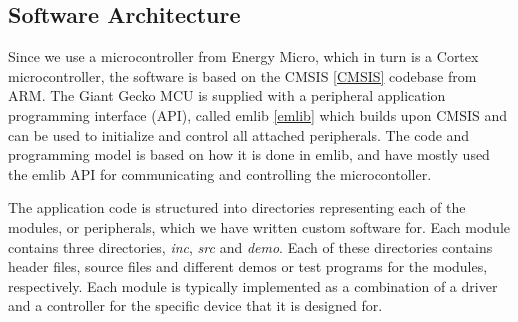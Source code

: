 \subsection{Software Architecture}


Since we use a microcontroller from Energy Micro, which in turn is a Cortex
microcontroller, the software is based on the CMSIS \ref{CMSIS} codebase from
ARM. The Giant Gecko MCU is supplied with a peripheral application programming
interface (API), called emlib \ref{emlib} which builds upon CMSIS and can be
used to initialize and control all attached peripherals. The code and
programming model is based on how it is done in emlib, and have mostly used the
emlib API for communicating and controlling the microcontoller.



The application code is structured into directories representing each of the
modules, or peripherals, which we have written custom software for. Each module
contains three directories, \textit{inc}, \textit{src} and \textit{demo}. Each
of these directories contains header files, source files and different demos or
test programs for the modules, respectively. Each module is typically
implemented as a combination of a driver and a controller for the specific
device that it is designed for.
